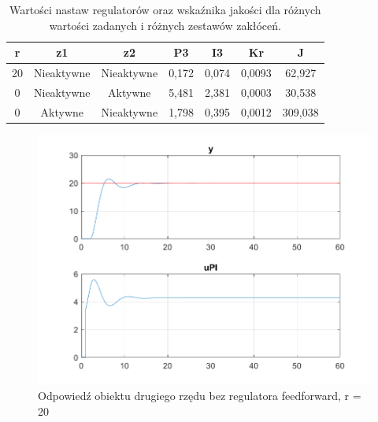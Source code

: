\begin{table}[h!]
	\centering
	\caption{Wartości nastaw regulatorów oraz wska\'znika jakości dla różnych wartości zadanych i różnych zestawów zakłóceń.}
	\label{bez_feedforward_tab}
	\begin{tabular}{|c|c|c|c|c|c|c|}
		\hline
		r & z1 & z2& P3 & I3 & Kr & J \\ \hline
		20 & Nieaktywne & Nieaktywne & 0,172 & 0,074 & 0,0093 & 62,927 \\ \hline
		0 & Nieaktywne & Aktywne & 5,481 & 2,381 & 0,0003 & 30,538 \\ \hline
		0 & Aktywne & Nieaktywne & 1,798 & 0,395 & 0,0012 & 309,038 \\ \hline
	\end{tabular}
\end{table}

\begin{figure}[h!]
	\centering
	\includegraphics[scale = 0.8]{fig/bezFeedforward/fig1_2_20_bezZaklocen.png}
	\caption		
	{Odpowiedź obiektu drugiego rzędu bez regulatora feedforward, r = 20}
	\label{wykres_5}
\end{figure} 


